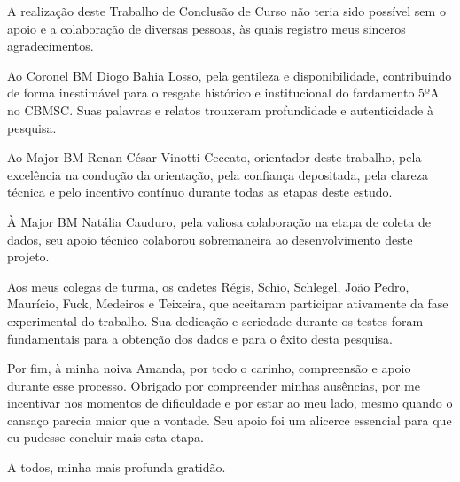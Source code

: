 
A realização deste Trabalho de Conclusão de Curso não teria sido possível sem o apoio e a colaboração de diversas pessoas, às quais registro meus sinceros agradecimentos.

Ao Coronel BM Diogo Bahia Losso, pela gentileza e disponibilidade, contribuindo de forma inestimável para o resgate histórico e institucional do fardamento 5ºA no CBMSC. Suas palavras e relatos trouxeram profundidade e autenticidade à pesquisa.

Ao Major BM Renan César Vinotti Ceccato, orientador deste trabalho, pela excelência na condução da orientação, pela confiança depositada, pela clareza técnica e pelo incentivo contínuo durante todas as etapas deste estudo.

À Major BM Natália Cauduro, pela valiosa colaboração na etapa de coleta de dados, seu apoio técnico colaborou sobremaneira ao desenvolvimento deste projeto.

Aos meus colegas de turma, os cadetes Régis, Schio, Schlegel, João Pedro, Maurício, Fuck, Medeiros e Teixeira, que aceitaram participar ativamente da fase experimental do trabalho. Sua dedicação e seriedade durante os testes foram fundamentais para a obtenção dos dados e para o êxito desta pesquisa.

Por fim, à minha noiva Amanda, por todo o carinho, compreensão e apoio durante esse processo. Obrigado por compreender minhas ausências, por me incentivar nos momentos de dificuldade e por estar ao meu lado, mesmo quando o cansaço parecia maior que a vontade. Seu apoio foi um alicerce essencial para que eu pudesse concluir mais esta etapa.

A todos, minha mais profunda gratidão.